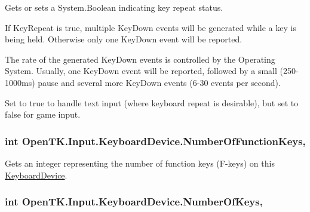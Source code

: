 Gets or sets a System.\-Boolean indicating key repeat status. 

If Key\-Repeat is true, multiple Key\-Down events will be generated while a key is being held. Otherwise only one Key\-Down event will be reported. 

The rate of the generated Key\-Down events is controlled by the Operating System. Usually, one Key\-Down event will be reported, followed by a small (250-\/1000ms) pause and several more Key\-Down events (6-\/30 events per second). 

Set to true to handle text input (where keyboard repeat is desirable), but set to false for game input. \hypertarget{class_open_t_k_1_1_input_1_1_keyboard_device_ac00e15c29e8b700cf8ec409c24ecc15f}{
\subsubsection[{Number\-Of\-Function\-Keys}]{\setlength{\rightskip}{0pt plus 5cm}int Open\-T\-K.\-Input.\-Keyboard\-Device.\-Number\-Of\-Function\-Keys\hspace{0.3cm}{\ttfamily [get]}, {\ttfamily [set]}}}\label{class_open_t_k_1_1_input_1_1_keyboard_device_ac00e15c29e8b700cf8ec409c24ecc15f}


Gets an integer representing the number of function keys (F-\/keys) on this \hyperlink{class_open_t_k_1_1_input_1_1_keyboard_device}{Keyboard\-Device}. 

\hypertarget{class_open_t_k_1_1_input_1_1_keyboard_device_a8cdb6aa74d46585a6eac945d9460ebb8}{
\subsubsection[{Number\-Of\-Keys}]{\setlength{\rightskip}{0pt plus 5cm}int Open\-T\-K.\-Input.\-Keyboard\-Device.\-Number\-Of\-Keys\hspace{0.3cm}{\ttfamily [get]}, {\ttfamily [set]}}}\label{class_open_t_k_1_1_input_1_1_keyboard_device_a8cdb6aa74d46585a6eac945d9460ebb8}


